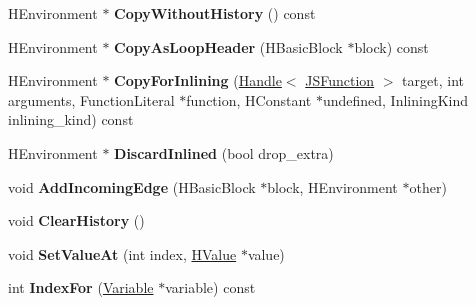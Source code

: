 \begin{DoxyCompactItemize}
\item 
\hypertarget{classv8_1_1internal_1_1_v8___f_i_n_a_l_a938d33ac5150cfd9795080b67b5ff8a8}{}H\+Environment $\ast$ {\bfseries Copy\+Without\+History} () const \label{classv8_1_1internal_1_1_v8___f_i_n_a_l_a938d33ac5150cfd9795080b67b5ff8a8}

\item 
\hypertarget{classv8_1_1internal_1_1_v8___f_i_n_a_l_abc268d64c0db1ad1f3410a8e0b3d789c}{}H\+Environment $\ast$ {\bfseries Copy\+As\+Loop\+Header} (H\+Basic\+Block $\ast$block) const \label{classv8_1_1internal_1_1_v8___f_i_n_a_l_abc268d64c0db1ad1f3410a8e0b3d789c}

\item 
\hypertarget{classv8_1_1internal_1_1_v8___f_i_n_a_l_aa541b833cc9d6608e59e5bc8b51405ba}{}H\+Environment $\ast$ {\bfseries Copy\+For\+Inlining} (\hyperlink{classv8_1_1internal_1_1_handle}{Handle}$<$ \hyperlink{classv8_1_1internal_1_1_j_s_function}{J\+S\+Function} $>$ target, int arguments, Function\+Literal $\ast$function, H\+Constant $\ast$undefined, Inlining\+Kind inlining\+\_\+kind) const \label{classv8_1_1internal_1_1_v8___f_i_n_a_l_aa541b833cc9d6608e59e5bc8b51405ba}

\item 
\hypertarget{classv8_1_1internal_1_1_v8___f_i_n_a_l_ad82a4ad7200f51aab00959f49c8d31e9}{}H\+Environment $\ast$ {\bfseries Discard\+Inlined} (bool drop\+\_\+extra)\label{classv8_1_1internal_1_1_v8___f_i_n_a_l_ad82a4ad7200f51aab00959f49c8d31e9}

\item 
\hypertarget{classv8_1_1internal_1_1_v8___f_i_n_a_l_ab18e434d0a1c9d992b9ae0434ec7e489}{}void {\bfseries Add\+Incoming\+Edge} (H\+Basic\+Block $\ast$block, H\+Environment $\ast$other)\label{classv8_1_1internal_1_1_v8___f_i_n_a_l_ab18e434d0a1c9d992b9ae0434ec7e489}

\item 
\hypertarget{classv8_1_1internal_1_1_v8___f_i_n_a_l_a437dc2fe6980dec1291495e3d9dc6478}{}void {\bfseries Clear\+History} ()\label{classv8_1_1internal_1_1_v8___f_i_n_a_l_a437dc2fe6980dec1291495e3d9dc6478}

\item 
\hypertarget{classv8_1_1internal_1_1_v8___f_i_n_a_l_a0a19916e6256f834d5e8b7f8ae058be1}{}void {\bfseries Set\+Value\+At} (int index, \hyperlink{classv8_1_1internal_1_1_h_value}{H\+Value} $\ast$value)\label{classv8_1_1internal_1_1_v8___f_i_n_a_l_a0a19916e6256f834d5e8b7f8ae058be1}

\item 
\hypertarget{classv8_1_1internal_1_1_v8___f_i_n_a_l_a9477d4b796a4f9583e5c8e572e37001d}{}int {\bfseries Index\+For} (\hyperlink{classv8_1_1internal_1_1_variable}{Variable} $\ast$variable) const \label{classv8_1_1internal_1_1_v8___f_i_n_a_l_a9477d4b796a4f9583e5c8e572e37001d}


\end{DoxyCompactItemize}
